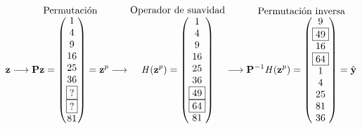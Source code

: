 \begin{figure}[H]
	\[
		\mathbf{z} \longrightarrow
		\overset{\mbox{Permutaci\'on}}{\mathbf{P}\mathbf{z} = \left(\begin{matrix}1\\4\\9\\16\\25\\36\\\boxed{?}\\\boxed{?}\\81\end{matrix}\right) = \mathbf{z}^p}
		\longrightarrow
		\overset{\mbox{Operador de suavidad}}{\mathit{H}(\mathbf{z}^p) = \left(\begin{matrix}1\\4\\9\\16\\25\\36\\\boxed{49}\\\boxed{64}\\81\end{matrix}\right)}
		\longrightarrow
		\overset{\mbox{Permutaci\'on inversa}}{ \mathbf{P}^{-1}\mathit{H}(\mathbf{z}^p) = \left(\begin{matrix}9\\\boxed{49}\\16\\\boxed{64}\\1\\4\\25\\81\\36\end{matrix}\right) = \hat{\mathbf{y}}}
	\]
	

\end{figure}
